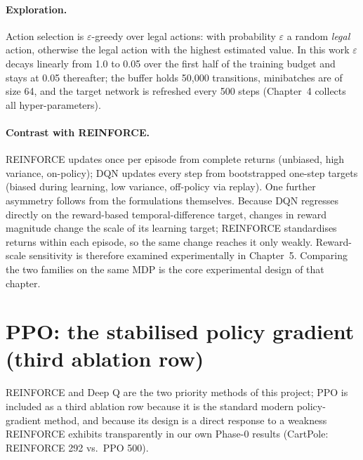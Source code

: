 \paragraph{Exploration.} Action selection is $\varepsilon$-greedy over
legal actions: with probability $\varepsilon$ a random \emph{legal}
action, otherwise the legal action with the highest estimated value. In
this work $\varepsilon$ decays linearly from 1.0 to 0.05 over the first
half of the training budget and stays at 0.05 thereafter; the buffer
holds 50{,}000 transitions, minibatches are of size 64, and the target
network is refreshed every 500 steps (Chapter~4 collects all
hyper-parameters).

\paragraph{Contrast with REINFORCE.} REINFORCE updates once per episode
from complete returns (unbiased, high variance, on-policy); DQN updates
every step from bootstrapped one-step targets (biased during learning, low
variance, off-policy via replay). One further asymmetry follows from the
formulations themselves. Because DQN regresses directly on the
reward-based temporal-difference target, changes in reward magnitude
change the scale of its learning target; REINFORCE standardises returns
within each episode, so the same change reaches it only weakly.
Reward-scale sensitivity is therefore examined experimentally in
Chapter~5. Comparing the two families on the same MDP is the core
experimental design of that chapter.

\section{PPO: the stabilised policy gradient (third ablation row)}
\label{sec:ppo}

REINFORCE and Deep Q are the two priority methods of this project; PPO is
included as a third ablation row because it is the standard modern
policy-gradient method, and because its design is a direct response to a
weakness REINFORCE exhibits transparently in our own Phase-0 results
(CartPole: REINFORCE 292 vs.\ PPO 500).

